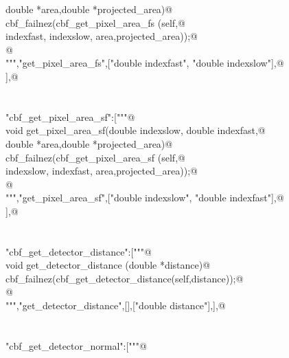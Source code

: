 \documentclass[10pt,a4paper,twoside,notitlepage]{article}
\begin{document}
\begin{flushleft}
\begin{list}{}{}
\mbox{}\verb@                        double *area,double *projected_area){@\\
\mbox{}\verb@       cbf_failnez(cbf_get_pixel_area_fs (self,@\\
\mbox{}\verb@                                       indexfast, indexslow, area,projected_area));@\\
\mbox{}\verb@      }@\\
\mbox{}\verb@""","get_pixel_area_fs",["double indexfast", "double indexslow"],@\\
\mbox{} ],@\\
\mbox{}\verb@@\\
\mbox{}\verb@@\\
\mbox{}\verb@"cbf_get_pixel_area_sf":["""@\\
\mbox{}\verb@%apply double *OUTPUT{double *area,double *projected_area};@\\
\mbox{}\verb@    void get_pixel_area_sf(double indexslow, double indexfast,@\\
\mbox{}\verb@                        double *area,double *projected_area){@\\
\mbox{}\verb@       cbf_failnez(cbf_get_pixel_area_sf (self,@\\
\mbox{}\verb@                                       indexslow, indexfast, area,projected_area));@\\
\mbox{}\verb@      }@\\
\mbox{}\verb@""","get_pixel_area_sf",["double indexslow", "double indexfast"],@\\
\mbox{} ],@\\
\mbox{}\verb@@\\
\mbox{}\verb@@\\
\mbox{}\verb@"cbf_get_detector_distance":["""@\\
\mbox{}\verb@%apply double *OUTPUT {double *distance};@\\
\mbox{}\verb@ void get_detector_distance (double *distance){@\\
\mbox{}\verb@  cbf_failnez(cbf_get_detector_distance(self,distance));@\\
\mbox{}\verb@  }@\\
\mbox{}\verb@""","get_detector_distance",[],["double distance"],],@\\
\mbox{}\verb@@\\
\mbox{}\verb@@\\
\mbox{}\verb@"cbf_get_detector_normal":["""@\\

\end{list}
\end{flushleft}
\end{document}
